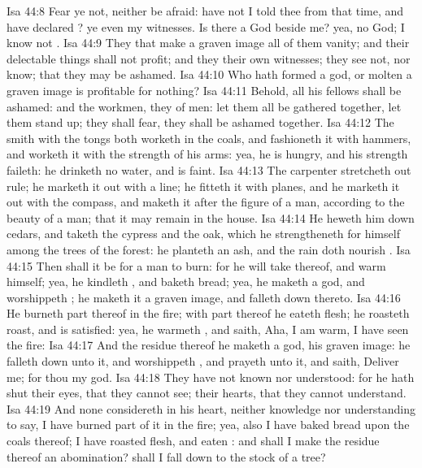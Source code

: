 \vs Isa 44:8 Fear ye not, neither be afraid: have not I told thee from that time, and have declared ? ye  even my witnesses. Is there a God beside me? yea,  no God; I know not .
\vs Isa 44:9 They that make a graven image  all of them vanity; and their delectable things shall not profit; and they  their own witnesses; they see not, nor know; that they may be ashamed.
\vs Isa 44:10 Who hath formed a god, or molten a graven image  is profitable for nothing?
\vs Isa 44:11 Behold, all his fellows shall be ashamed: and the workmen, they  of men: let them all be gathered together, let them stand up;  they shall fear,  they shall be ashamed together.
\vs Isa 44:12 The smith with the tongs both worketh in the coals, and fashioneth it with hammers, and worketh it with the strength of his arms: yea, he is hungry, and his strength faileth: he drinketh no water, and is faint.
\vs Isa 44:13 The carpenter stretcheth out  rule; he marketh it out with a line; he fitteth it with planes, and he marketh it out with the compass, and maketh it after the figure of a man, according to the beauty of a man; that it may remain in the house.
\vs Isa 44:14 He heweth him down cedars, and taketh the cypress and the oak, which he strengtheneth for himself among the trees of the forest: he planteth an ash, and the rain doth nourish .
\vs Isa 44:15 Then shall it be for a man to burn: for he will take thereof, and warm himself; yea, he kindleth , and baketh bread; yea, he maketh a god, and worshippeth ; he maketh it a graven image, and falleth down thereto.
\vs Isa 44:16 He burneth part thereof in the fire; with part thereof he eateth flesh; he roasteth roast, and is satisfied: yea, he warmeth , and saith, Aha, I am warm, I have seen the fire:
\vs Isa 44:17 And the residue thereof he maketh a god,  his graven image: he falleth down unto it, and worshippeth , and prayeth unto it, and saith, Deliver me; for thou  my god.
\vs Isa 44:18 They have not known nor understood: for he hath shut their eyes, that they cannot see;  their hearts, that they cannot understand.
\vs Isa 44:19 And none considereth in his heart, neither  knowledge nor understanding to say, I have burned part of it in the fire; yea, also I have baked bread upon the coals thereof; I have roasted flesh, and eaten : and shall I make the residue thereof an abomination? shall I fall down to the stock of a tree?
